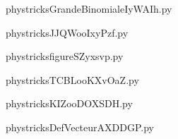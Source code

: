     \newcommand{\CaptionFigGrandeBinomialeIyWAIh}{<+Type your caption here+>}
    \begin{center}
        
    \end{center}
    phystricksGrandeBinomialeIyWAIh.py

    

    \clearpage
    


    \newcommand{\CaptionFigJJQWooIxyPzf}{<+Type your caption here+>}
    \begin{center}
        
    \end{center}
    phystricksJJQWooIxyPzf.py

    

    \clearpage
    


    \newcommand{\CaptionFigfigureSZyxsvp}{<+Type your caption here+>}
    \begin{center}
        
    \end{center}
    phystricksfigureSZyxsvp.py

    

    \clearpage
    


    \newcommand{\CaptionFigTCBLooKXvOaZ}{<+Type your caption here+>}
    \begin{center}
        
    \end{center}
    phystricksTCBLooKXvOaZ.py

    

    \clearpage
    


    \newcommand{\CaptionFigKIZooDOXSDH}{<+Type your caption here+>}
    \begin{center}
        
    \end{center}
    phystricksKIZooDOXSDH.py

    

    \clearpage
    


    \newcommand{\CaptionFigDefVecteurAXDDGP}{<+Type your caption here+>}
    \begin{center}
        
    \end{center}
    phystricksDefVecteurAXDDGP.py

